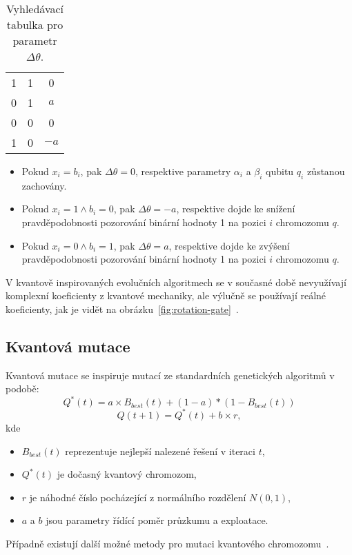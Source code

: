 \begin{enumerate}
\begin{table}[ht!]
\begin{tabular}{c c|c}
            \midrule
            1                       & 1                      & 0                      \\ 
            0                       & 1                      & $a$                      \\ 
            0                       & 0                      & 0                      \\ 
            1                       & 0                      & $-a$                     \\
            \bottomrule
            \end{tabular}
            \caption{Vyhledávací tabulka pro parametr $\Delta\theta$.}
            \label{tab:look-up-table-Delta}
        \end{table}
        \begin{itemize}
            \item Pokud $x_i = b_i$, pak $\Delta \theta = 0$, respektive parametry $\alpha_i$ a $\beta_i$ qubitu $q_i$ zůstanou zachovány.
            \item Pokud $x_i = 1 \wedge b_i = 0$, pak $\Delta \theta = -a$, respektive dojde ke snížení pravděpodobnosti pozorování binární hodnoty 1 na pozici $i$ chromozomu $q$. 
            \item Pokud $x_i = 0 \wedge b_i = 1$, pak $\Delta \theta =  a$, respektive dojde ke zvýšení pravděpodobnosti pozorování binární hodnoty 1 na pozici $i$ chromozomu $q$. 
        \end{itemize}
\end{enumerate}

V kvantově inspirovaných evolučních algoritmech se v současné době nevyužívají komplexní koeficienty z kvantové mechaniky, ale výlučně se používají reálné koeficienty, jak je vidět na obrázku~\ref{fig:rotation-gate}~\cite{NaturalComputing}.

\newpage
\subsection{Kvantová mutace}
Kvantová mutace se inspiruje mutací ze standardních genetických algoritmů v podobě:
\begin{equation*}
    Q^*(t) = a \times B_{best}(t) + (1 - a) * (1 - B_{best}(t))
\end{equation*}
\begin{equation*}
    Q(t+1) = Q^*(t) + b \times r,
\end{equation*}
kde
\begin{itemize}
    \item $B_{best}(t)$ reprezentuje nejlepší nalezené řešení v iteraci $t$,
    \item $Q^*(t)$ je dočasný kvantový chromozom,
    \item $r$ je náhodné číslo pocházející z normálního rozdělení $N(0,1)$,
    \item $a$ a $b$ jsou parametry řídící poměr průzkumu a exploatace.
\end{itemize}
Případně existují další možné metody pro mutaci kvantového chromozomu~\cite{NaturalComputing}.


